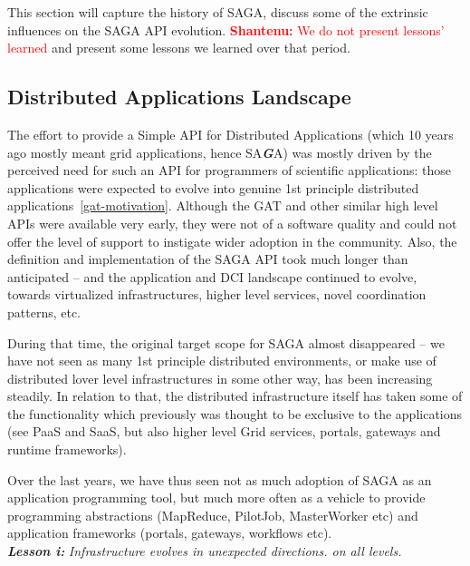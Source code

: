\documentclass[]{article}
\newcommand{\I}[1]{\textit{#1}}
\newcommand{\B}[1]{\textbf{#1}}
\newcommand{\BI}[1]{\textbf{\textit{#1}}}
\newcommand{\smilie}{\small;-)~\xspace}
\newcommand{\jhanote}[1]{{\textcolor{red}{     \B{Shantenu:} #1 }}}
\newcommand{\jhanote}[1]{}
\begin{document}
This section will capture the history of SAGA, discuss some of the
extrinsic influences on the SAGA API evolution.  \jhanote{We do not
  present lessons' learned} and present some lessons we learned over
that period.  



\subsection{Distributed Applications Landscape}

  The effort to provide a Simple API for Distributed Applications
  (which 10 years ago mostly meant grid applications, hence SA\BI{G}A)
  was mostly driven by the perceived need for such an API for
  programmers of scientific applications: those applications were
  expected to evolve into genuine 1st principle distributed
  applications~\ref{gat-motivation}.  Although the GAT and other
  similar high level APIs were available very early, they were not of
  a software quality and could not offer the level of support to
  instigate wider adoption in the community.  Also, the definition and
  implementation of the SAGA API took much longer than anticipated --
  and the application and DCI landscape continued to evolve, towards
  virtualized infrastructures, higher level services, novel
  coordination patterns, etc.
  
  During that time, the original target scope for SAGA almost
  disappeared -- we have not seen as many 1st principle distributed
  environments, or make use of distributed lover level infrastructures
  in some other way, has been increasing steadily.  In relation to
  that, the distributed infrastructure itself has taken some of the
  functionality which previously was thought to be exclusive to the
  applications (see PaaS and SaaS, but also higher level Grid
  services, portals, gateways and runtime frameworks).

  Over the last years, we have thus seen not as much adoption of SAGA
  as an application programming tool, but much more often as a vehicle
  to provide programming abstractions (MapReduce, PilotJob,
  MasterWorker etc) and application frameworks (portals, gateways,
  workflows etc).\\
  \BI{Lesson i:} \I{Infrastructure evolves in unexpected directions.
  on all levels.}
\end{document}
